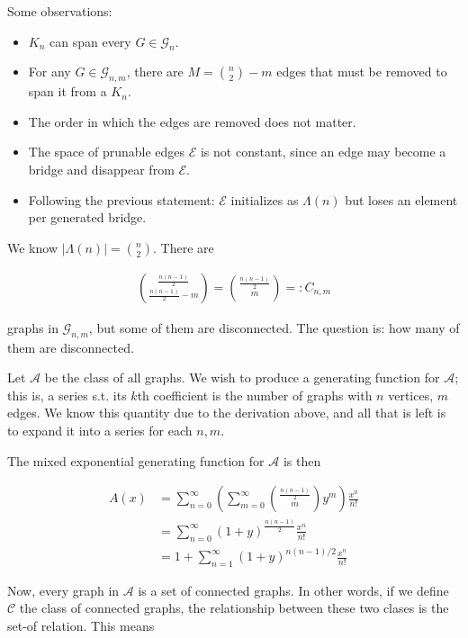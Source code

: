 \documentclass[a4paper, 12pt]{article}
\begin{document}
Some observations:

\begin{itemize}
    \item $K_n$ can span every $G \in \mathcal{G}_n$.
    \item For any $G \in \mathcal{G}_{n, m}$, there are $M = \binom{n}{2} - m$ edges that must be 
        removed to span it from a $K_n$.
    \item The order in which the edges are removed does not matter.
    \item The space of prunable edges $\mathcal{E}$ is not constant, since an edge may become 
        a bridge and disappear from $\mathcal{E}$.
    \item Following the previous statement: $\mathcal{E}$ initializes as $\Lambda(n)$ but 
        loses an element per generated bridge.
\end{itemize}

We know $|\Lambda(n)| = \binom{n}{2}$. There are 

\begin{align*}
    \binom{\frac{n(n-1)}{2}}{\frac{n(n-1)}{2} - m} = \binom{\frac{n(n-1)}{2}}{m} =: C_{n, m}
\end{align*}

graphs in $\mathcal{G}_{n, m}$, but some of them are disconnected. The question
is: how many of them are disconnected. 

Let $\mathcal{A}$ be the class of all graphs. We wish to produce a generating
function for $\mathcal{A}$; this is, a series s.t. its $k$th coefficient is the
number of graphs with $n$ vertices, $m$ edges. We know this quantity
due to the derivation above, and all that is left is to expand it into a series
for each $n, m$.

The mixed exponential generating function for $\mathcal{A}$ is then

\begin{align*}
    A(x) &= \sum_{n=0}^{\infty}\left(\sum_{m = 0}^{\infty} \binom{\frac{n(n-1)}{2}}{m}  y^m\right) \frac{x^n}{n!}\\
                                                               &=\sum_{n=0}^{\infty}(1 + y)^{\frac{n(n-1)}{2}} \frac{x^n}{n!} \\ 
                                                               &= 1 + \sum_{n=1}^{\infty} (1+y)^{n(n-1)/2} \frac{x^n}{n!}
\end{align*}

Now, every graph in $\mathcal{A}$ is a set of connected graphs. In other words,
if we define $\mathcal{C}$ the class of connected graphs, the relationship
between these two clases is the set-of relation. This means 
\end{document}
